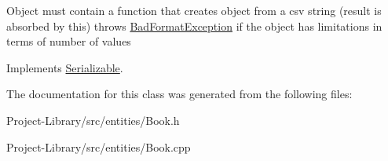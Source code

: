 Object must contain a function that creates object from a csv string (result is absorbed by this) throws \hyperlink{structBadFormatException}{Bad\+Format\+Exception} if the object has limitations in terms of number of values 

Implements \hyperlink{classSerializable_abaec34cf73821a3234cf4daea584eab3}{Serializable}.



The documentation for this class was generated from the following files\+:\begin{DoxyCompactItemize}
\item 
Project-\/\+Library/src/entities/Book.\+h\item 
Project-\/\+Library/src/entities/Book.\+cpp\end{DoxyCompactItemize}
